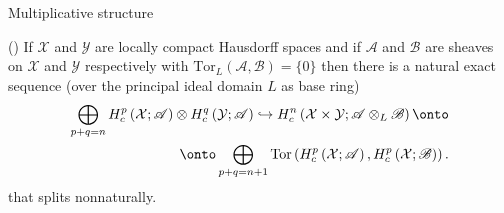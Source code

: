 \documentclass{beamer}
\theoremstyle{plain}
\newcommand{\bean}{\begin{eqnarray*}}
\newcommand{\eean}{\end{eqnarray*}}
\newcommand{\sX}{\mathcal{X}}       %
\newcommand{\sY}{\mathcal{Y}}       %
\newcommand{\hookto}{\hookrightarrow}        %
\begin{document}
\begin{frame}
		{\Large Multiplicative structure} 
			\begin{theorem}
			() If $\sX$ and $\sY$ are locally compact Hausdorff 
			spaces and if $\mathscr A$ and $\mathscr B$ are sheaves on $\sX$ and $\sY$ respectively with $\mathrm{Tor}_L\left(\mathscr A, \mathscr B \right) = \{0\}$
			then there is a natural exact sequence (over the principal ideal domain $L$
			as base ring)
			\bean
			\begin{split}
				\bigoplus_{p+q = n} H^p_c\left(\sX; \mathscr A \right) \otimes H^q_c\left(\sY; \mathscr A \right)\hookto H^n_c\left(\sX\times \sY; \mathscr A\otimes_L\mathscr B \right)\onto\\ \onto  \bigoplus_{p+q = n+1} \mathrm{Tor}\left( H^p_c\left(\sX; \mathscr A \right),  H^p_c\left(\sX; \mathscr B \right) \right). 
			\end{split}
			\eean
			that splits nonnaturally.	
		\end{theorem}
		
\end{frame}
\end{document}
